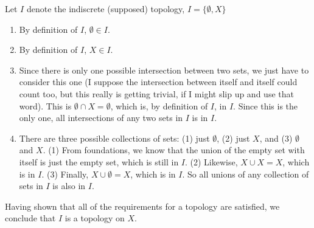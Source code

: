 \documentclass{article}
\theoremstyle{definition}
\begin{document}
 Let $I$ denote the indiscrete (supposed) topology, $I = \{\emptyset , X\}$
\begin{enumerate}
    \item By definition of $I$, $\emptyset\in I$.
    \item By definition of $I$, $ X\in I$.
    \item Since there is only one possible intersection between two sets, we just have to consider this one (I suppose the intersection between itself and itself could count too, but this really is getting trivial, if I might slip up and use that word). This is $\emptyset \cap X = \emptyset$, which is, by definition of $I$, in $I$. Since this is the only one, all intersections of any two sets in $ I $ is in $I$.
    \item There are three possible collections of sets:  (1) just $\emptyset$, (2) just $X$, and (3) $\emptyset$ and $X$. (1) From foundations, we know that the union of the empty set with itself is just the empty set, which is still in $I$. (2) Likewise, $ X \cup X = X$, which is in $I$. (3) Finally, $X\cup \emptyset = X$, which is in $I$. So all unions of any collection of sets in $I$ is also in $I$.
\end{enumerate}
Having shown that all of the requirements for a topology are satisfied, we conclude that $I$ is a topology on $X$.\\
\end{document}

